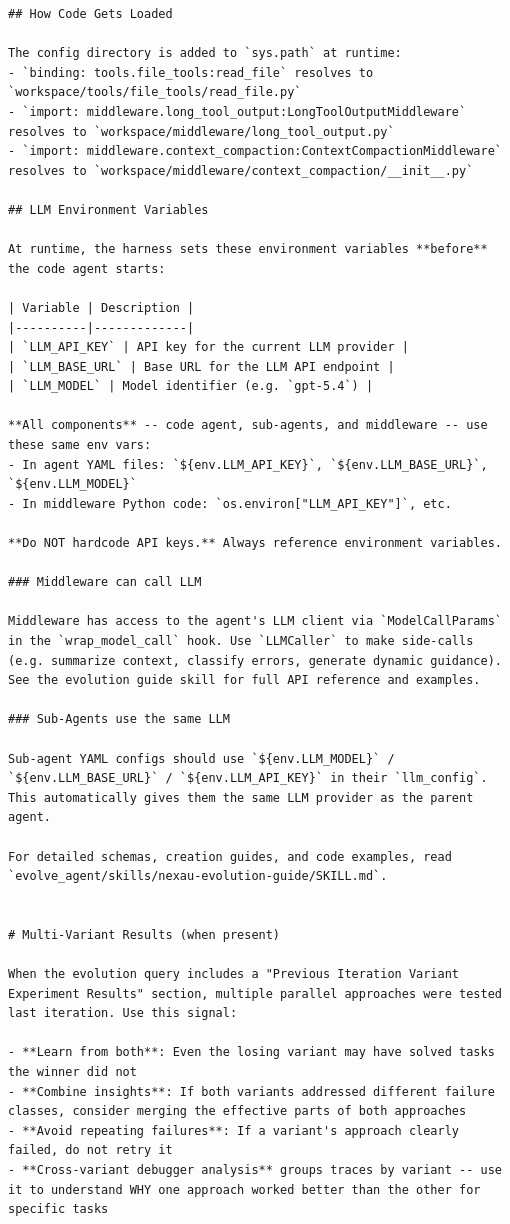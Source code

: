 \begin{tcolorbox}
\begin{lstlisting}
## How Code Gets Loaded

The config directory is added to `sys.path` at runtime:
- `binding: tools.file_tools:read_file` resolves to `workspace/tools/file_tools/read_file.py`
- `import: middleware.long_tool_output:LongToolOutputMiddleware` resolves to `workspace/middleware/long_tool_output.py`
- `import: middleware.context_compaction:ContextCompactionMiddleware` resolves to `workspace/middleware/context_compaction/__init__.py`

## LLM Environment Variables

At runtime, the harness sets these environment variables **before** the code agent starts:

| Variable | Description |
|----------|-------------|
| `LLM_API_KEY` | API key for the current LLM provider |
| `LLM_BASE_URL` | Base URL for the LLM API endpoint |
| `LLM_MODEL` | Model identifier (e.g. `gpt-5.4`) |

**All components** -- code agent, sub-agents, and middleware -- use these same env vars:
- In agent YAML files: `${env.LLM_API_KEY}`, `${env.LLM_BASE_URL}`, `${env.LLM_MODEL}`
- In middleware Python code: `os.environ["LLM_API_KEY"]`, etc.

**Do NOT hardcode API keys.** Always reference environment variables.

### Middleware can call LLM

Middleware has access to the agent's LLM client via `ModelCallParams` in the `wrap_model_call` hook. Use `LLMCaller` to make side-calls (e.g. summarize context, classify errors, generate dynamic guidance). See the evolution guide skill for full API reference and examples.

### Sub-Agents use the same LLM

Sub-agent YAML configs should use `${env.LLM_MODEL}` / `${env.LLM_BASE_URL}` / `${env.LLM_API_KEY}` in their `llm_config`. This automatically gives them the same LLM provider as the parent agent.

For detailed schemas, creation guides, and code examples, read `evolve_agent/skills/nexau-evolution-guide/SKILL.md`.


# Multi-Variant Results (when present)

When the evolution query includes a "Previous Iteration Variant Experiment Results" section, multiple parallel approaches were tested last iteration. Use this signal:

- **Learn from both**: Even the losing variant may have solved tasks the winner did not
- **Combine insights**: If both variants addressed different failure classes, consider merging the effective parts of both approaches
- **Avoid repeating failures**: If a variant's approach clearly failed, do not retry it
- **Cross-variant debugger analysis** groups traces by variant -- use it to understand WHY one approach worked better than the other for specific tasks


\end{lstlisting}
\end{tcolorbox}
